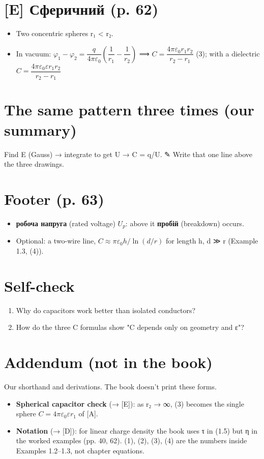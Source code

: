 \documentclass[11pt,a4paper,oneside]{book}
\newcommand{\pen}{{\sffamily\color{accent}✎}}
\begin{document}
\section*{[E] Сферичний (p. 62)}
\begin{itemize}
\item Two concentric spheres r₁ < r₂.
\item In vacuum: $\varphi_1-\varphi_2 = \dfrac{q}{4\pi\varepsilon_0}\left(\dfrac1{r_1}-\dfrac1{r_2}\right)$ ⟹ $C = \dfrac{4\pi\varepsilon_0r_1r_2}{r_2-r_1}$ (3); with a dielectric $C = \dfrac{4\pi\varepsilon_0\varepsilon r_1r_2}{r_2-r_1}$
\end{itemize}

\section*{The same pattern three times (our summary)}
Find E (Gauss) → integrate to get U → C = q/U. \pen{} Write that one line above the three drawings.

\section*{Footer (p. 63)}
\begin{itemize}
\item \textbf{робоча напруга} (rated voltage) $U_{p}$: above it \textbf{пробій} (breakdown) occurs.
\item Optional: a two-wire line, $C \approx \pi\varepsilon_0h/\ln(d/r)$ for length h, d ≫ r (Example 1.3, (4)).
\end{itemize}

\section*{Self-check}
\begin{enumerate}
\item Why do capacitors work better than isolated conductors?
\item How do the three C formulas show "C depends only on geometry and ε"?
\end{enumerate}

\section*{Addendum (not in the book)}
Our shorthand and derivations. The book doesn't print these forms.
\begin{itemize}
\item \textbf{Spherical capacitor check} (→ [E]): as r₂ → ∞, (3) becomes the single sphere $C = 4\pi\varepsilon_0\varepsilon r_1$ of [A].
\item \textbf{Notation} (→ [D]): for linear charge density the book uses τ in (1.5) but η in the worked examples (pp. 40, 62). (1), (2), (3), (4) are the numbers inside Examples 1.2–1.3, not chapter equations.
\end{itemize}
\end{document}
